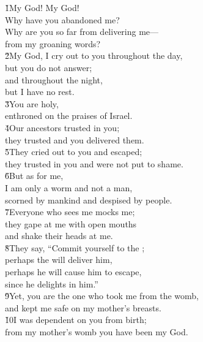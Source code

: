 \begin{poetry}
\poeml \v{1}My God! My God! \\
\poemll    Why have you abandoned me? \\
\poeml Why are you so far from delivering me--- \\
\poemll    from my groaning words? \\
\poeml \v{2}My God, I cry out to you throughout the day, \\
\poemll    but you do not answer; \\
\poeml and throughout the night, \\
\poemll    but I have no rest. \\
\poeml \v{3}You are holy, \\
\poemll    enthroned on the praises of Israel. \\
\poeml \v{4}Our ancestors trusted in you; \\
\poemll    they trusted and you delivered them. \\
\poeml \v{5}They cried out to you and escaped; \\
\poemll    they trusted in you and were not put to shame. \\
\poeml \v{6}But as for me, \\
\poemll    I am only a worm and not a man, \\
\poemlll       scorned by mankind and despised by people. \\
\poeml \v{7}Everyone who sees me mocks me; \\
\poemll    they gape at me with open mouths \\
\poemlll       and shake their heads at me. \\
\poeml \v{8}They say, ``Commit yourself to the ; \\
\poemll    perhaps the  will deliver him, \\
\poeml perhaps he will cause him to escape, \\
\poemll    since he delights in him.'' \\
\poeml \v{9}Yet, you are the one who took me from the womb, \\
\poemll    and kept me safe on my mother's breasts. \\
\poeml \v{10}I was dependent on you from birth; \\
\poemll    from my mother's womb you have been my God. \\

\end{poetry}
